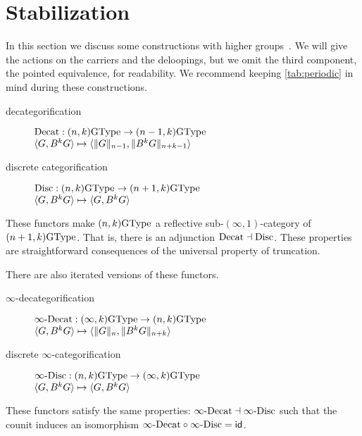 \section{Stabilization}
\label{sec:stabilization}

In this section we discuss some constructions with higher groups~\cite{BaezDolan1998}. We will give the actions on the carriers and the deloopings, but we omit the third component, the pointed equivalence, for readability. We recommend keeping \autoref{tab:periodic} in mind during these constructions.
\begin{description}
\item[decategorification] $\Decat : (n,k)\GType \to (n-1,k)\GType$\\
  $\angled{G,B^kG} \mapsto \angled{\trunc{n-1}{G}, \trunc{n+k-1}{B^kG}}$
\item[discrete categorification] $\Disc : (n,k)\GType \to (n+1,k)\GType$ \\
  $\angled{G,B^kG} \mapsto \angled{G,B^kG}$
\end{description}
These functors make $(n,k)\GType$ a reflective sub-$(\infty,1)$-category of $(n+1,k)\GType$. That is, there is an adjunction ${\Decat} \dashv {\Disc}$. These properties are straightforward consequences of the universal property of truncation.

There are also iterated versions of these functors.
\begin{description}
  \item[$\infty$-decategorification] $\iDecat : (\infty,k)\GType \to (n,k)\GType$\\
    $\angled{G,B^kG} \mapsto \angled{\trunc{n}{G}, \trunc{n+k}{B^kG}}$
  \item[discrete $\infty$-categorification] $\iDisc : (n,k)\GType \to (\infty,k)\GType$ \\
    $\angled{G,B^kG} \mapsto \angled{G,B^kG}$
\end{description}
These functors satisfy the same properties: ${\iDecat} \dashv {\iDisc}$ such that the counit induces an isomorphism ${\iDecat} \circ {\iDisc} = \idfunc$.

